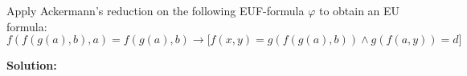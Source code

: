 \documentclass[11pt,a4paper]{uebung}
\newcommand{\solution}[1]{\par {\bf Solution:}\\#1}
\begin{document}

\newpage
{}
Apply Ackermann's reduction on the following EUF-formula $\varphi$ to obtain
an EU formula:
\begin{displaymath}
  f\left(f\left(g\left(a\right),b\right),a\right) = f(g(a),b) \rightarrow \big[ f(x,y) = g(f(g(a),b)) \land
  g(f(a,y))=d \big]
\end{displaymath}


\solution{
}
\end{document}
